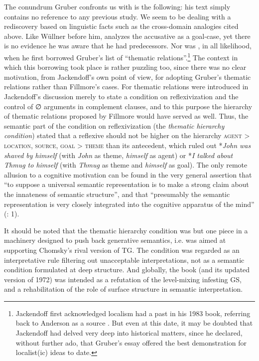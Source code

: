 \documentclass[output=paper]{langscibook}
\begin{document}
The conundrum Gruber confronts us with is the following: his text simply contains no reference to any previous study. We seem to be dealing with a rediscovery based on linguistic facts such as the cross-domain analogies cited above. Like Wüllner before him, \citet{gruber_look_1967} analyzes the accusative as a goal-case, yet there is no evidence he was aware that he had predecessors. Nor was \citet{jackendoff_rules_1969}, in all likelihood, when he first borrowed Gruber’s list of “thematic relations”.\footnote{Jackendoff first acknowledged localism had a past in his 1983 book, referring back to Anderson as a source \citep[188]{jackendoff_semantics_1983}. But even at this date, it may be doubted that Jackendoff had delved very deep into historical matters, since he declared, without further ado, that Gruber’s essay offered the best demonstration for localist(ic) ideas to date.} The context in which this borrowing took place is rather puzzling too, since there was no clear motivation, from Jackendoff’s own point of view, for adopting Gruber’s thematic relations rather than Fillmore’s cases. For thematic relations were introduced in Jackendoff’s discussion merely to state a condition on reflexivization and the control of ∅ arguments in complement clauses, and to this purpose the hierarchy of thematic relations proposed by Fillmore would have served as well. Thus, the semantic part of the condition on reflexivization (the \textit{thematic hierarchy condition}) stated that a reflexive should not be higher on the hierarchy \textsc{agent} {\textgreater} \textsc{location}, \textsc{source}, \textsc{goal} {\textgreater} \textsc{theme} than its antecedent, which ruled out *\textit{John was shaved by himself} (with \textit{John} as theme, \textit{himself} as agent) or *\textit{I talked about Thmug to himself} (with \textit{Thmug} as theme and \textit{himself} as goal). The only remote allusion to a cognitive motivation can be found in the very general assertion that “to suppose a universal semantic representation is to make a strong claim about the innateness of semantic structure”, and that “presumably the semantic representation is very closely integrated into the cognitive apparatus of the mind” (\citeyear{jackendoff_rules_1969}: 1).

It should be noted that the thematic hierarchy condition was but one piece in a machinery designed to push back generative semantics, i.e. was aimed at supporting Chomsky’s rival version of TG. The condition was regarded as an interpretative rule filtering out unacceptable interpretations, not as a semantic condition formulated at deep structure. And globally, the book (and its updated version of 1972) was intended as a refutation of the level-mixing infesting GS, and a rehabilitation of the role of surface structure in semantic interpretation.
\end{document}
